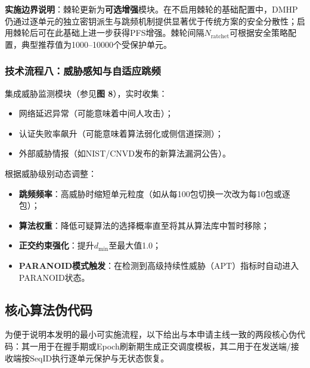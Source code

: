 ﻿\documentclass[12pt,a4paper]{article}
\begin{document}
\textbf{实施边界说明}：棘轮更新为\textbf{可选增强}模块。在不启用棘轮的基础配置中，DMHP仍通过逐单元的独立密钥派生与跳频机制提供显著优于传统方案的安全分散性；启用棘轮后可在此基础上进一步获得PFS增强。棘轮间隔$N_{\text{ratchet}}$可根据安全策略配置，典型推荐值为1000--10000个受保护单元。

\subsubsection*{技术流程八：威胁感知与自适应跳频}

集成威胁监测模块（参见\textbf{图 8}），实时收集：

\begin{itemize}
    \item 网络延迟异常（可能意味着中间人攻击）；
    \item 认证失败率飙升（可能意味着算法弱化或侧信道探测）；
    \item 外部威胁情报（如NIST/CNVD发布的新算法漏洞公告）。
\end{itemize}

根据威胁级别动态调整：

\begin{itemize}
    \item \textbf{跳频频率}：高威胁时缩短单元粒度（如从每100包切换一次改为每10包或逐包）；
    \item \textbf{算法权重}：降低可疑算法的选择概率直至将其从算法库中暂时移除；
    \item \textbf{正交约束强化}：提升$d_{\min}$至最大值1.0；
    \item \textbf{PARANOID模式触发}：在检测到高级持续性威胁（APT）指标时自动进入PARANOID状态。
\end{itemize}

\subsection*{核心算法伪代码}

为便于说明本发明的最小可实施流程，以下给出与本申请主线一致的两段核心伪代码：其一用于在握手期或Epoch刷新期生成正交调度模板，其二用于在发送端/接收端按$\text{SeqID}$执行逐单元保护与无状态恢复。
\end{document}
